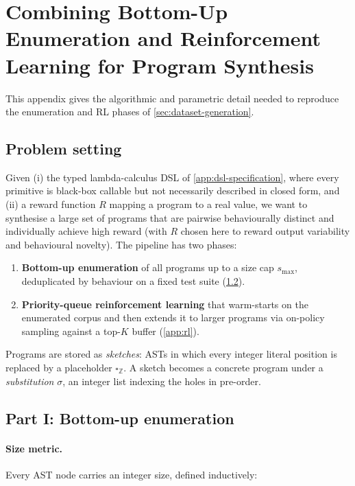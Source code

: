 \documentclass[12pt]{article}
\begin{document}
\section{Combining Bottom-Up Enumeration and Reinforcement Learning for Program Synthesis}
\label{app:enumeration-rl}

This appendix gives the algorithmic and parametric detail needed to reproduce the enumeration and RL phases of \cref{sec:dataset-generation}. 

\subsection{Problem setting}\label{app:enum-rl-problem}

Given (i) the typed lambda-calculus DSL of \cref{app:dsl-specification}, where every primitive is black-box callable but not necessarily described in closed form, and (ii) a reward function $R$ mapping a program to a real value, we want to synthesise a large set of programs that are pairwise behaviourally distinct and individually achieve high reward (with $R$ chosen here to reward output variability and behavioural novelty). The pipeline has two phases:
\begin{enumerate}
  \item \textbf{Bottom-up enumeration} of all programs up to a size cap $s_{\max}$, deduplicated by behaviour on a fixed test suite (\cref{app:enum}).
  \item \textbf{Priority-queue reinforcement learning} \citep{abolafia2018priority} that warm-starts on the enumerated corpus and then extends it to larger programs via on-policy sampling against a top-$K$ buffer (\cref{app:rl}).
\end{enumerate}
Programs are stored as \emph{sketches}: ASTs in which every integer literal position is replaced by a placeholder $\square_{\mathbb{Z}}$. A sketch becomes a concrete program under a \emph{substitution} $\sigma$, an integer list indexing the holes in pre-order.

\subsection{Part I: Bottom-up enumeration}\label{app:enum}

\paragraph{Size metric.} Every AST node carries an integer size, defined inductively:
\end{document}
